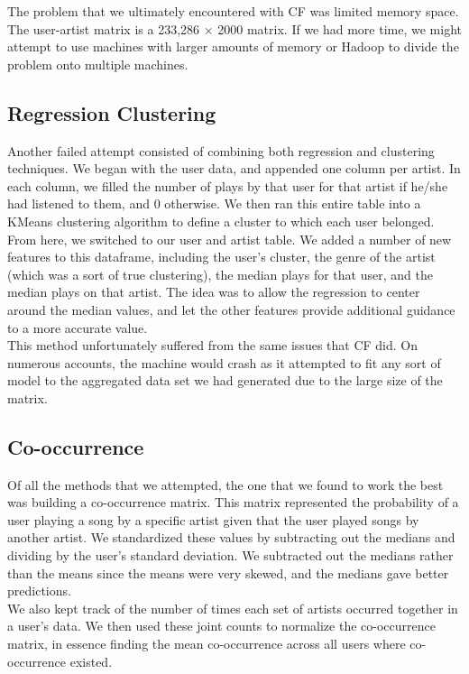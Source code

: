 \documentclass[11pt]{article}
\begin{document}
The problem that we ultimately encountered with CF was limited memory space. The user-artist matrix is a 233,286 $\times$ 2000 matrix. If we had more time, we might attempt to use machines with larger amounts of memory or Hadoop to divide the problem onto multiple machines. 

\subsection{Regression Clustering}
Another failed attempt consisted of combining both regression and clustering techniques. We began with the user data, and appended one column per artist. In each column, we filled the number of plays by that user for that artist if he/she had listened to them, and 0 otherwise. We then ran this entire table into a KMeans clustering algorithm to define a cluster to which each user belonged. From here, we switched to our user and artist table. We added a number of new features to this dataframe, including the user's cluster, the genre of the artist (which was a sort of true clustering), the median plays for that user, and the median plays on that artist. The idea was to allow the regression to center around the median values, and let the other features provide additional guidance to a more accurate value. \\

This method unfortunately suffered from the same issues that CF did. On numerous accounts, the machine would crash as it attempted to fit any sort of model to the aggregated data set we had generated due to the large size of the matrix.\\ 

\subsection{Co-occurrence}

Of all the methods that we attempted, the one that we found to work the best was building a co-occurrence matrix.  This matrix represented the probability of a user playing a song by a specific artist given that the user played songs by another artist.  We standardized these values by subtracting out the medians and dividing by the user's standard deviation.  We subtracted out the medians rather than the means since the means were very skewed, and the medians gave better predictions. \\

We also kept track of the number of times each set of artists occurred together in a user's data.  We then used these joint counts to normalize the co-occurrence matrix, in essence finding the mean co-occurrence across all users where co-occurrence existed. \\
\end{document}
